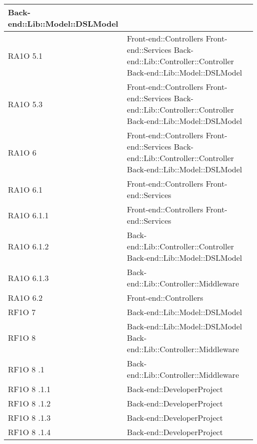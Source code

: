 \begin{center}
\begin{longtable}{|p{3cm}|p{7cm}|}
      			Back-end::Lib::Model::DSLModel \\ \hline
	  RA1O 5.1 & Front-end::Controllers \newline
	  			Front-end::Services \newline
	  			Back-end::Lib::Controller::Controller\newline
	  			Back-end::Lib::Model::DSLModel \\ \hline
	  RA1O 5.3 & Front-end::Controllers \newline
	  			Front-end::Services \newline
	  			Back-end::Lib::Controller::Controller\newline
	  			Back-end::Lib::Model::DSLModel \\ \hline
	  RA1O 6 & Front-end::Controllers \newline
	  			Front-end::Services \newline
	  			Back-end::Lib::Controller::Controller\newline
	  			Back-end::Lib::Model::DSLModel \\ \hline
	  RA1O 6.1 & Front-end::Controllers \newline
	  			Front-end::Services \\ \hline
	  RA1O 6.1.1 & Front-end::Controllers \newline
	  			Front-end::Services \\ \hline
	  RA1O 6.1.2	 & Back-end::Lib::Controller::Controller\newline
	  			Back-end::Lib::Model::DSLModel \\ \hline
	  RA1O 6.1.3 & Back-end::Lib::Controller::Middleware \\ \hline
	  RA1O 6.2 & Front-end::Controllers \\ \hline
      RF1O 7 & Back-end::Lib::Model::DSLModel \\ \hline
      RF1O 8	 & Back-end::Lib::Model::DSLModel \newline     
      			Back-end::Lib::Controller::Middleware \\ \hline
      RF1O 8	.1 & Back-end::Lib::Controller::Middleware \\ \hline
      RF1O 8	.1.1 & Back-end::DeveloperProject \\ \hline
      RF1O 8	.1.2 & Back-end::DeveloperProject \\ \hline
      RF1O 8	.1.3 & Back-end::DeveloperProject \\ \hline
      RF1O 8	.1.4 & Back-end::DeveloperProject \\ \hline

\end{longtable}
\end{center}
